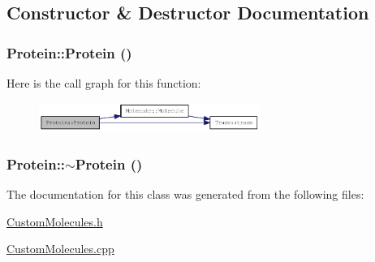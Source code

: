 \subsection{Constructor \& Destructor Documentation}
\hypertarget{classProtein_a4610c6369d2f7e4bd31481d53e5001a1}{
\subsubsection[{Protein}]{\setlength{\rightskip}{0pt plus 5cm}Protein::Protein ()}}
\label{classProtein_a4610c6369d2f7e4bd31481d53e5001a1}


Here is the call graph for this function:\nopagebreak
\begin{figure}[H]
\begin{center}
\leavevmode
\includegraphics[width=204pt]{classProtein_a4610c6369d2f7e4bd31481d53e5001a1_cgraph}
\end{center}
\end{figure}
\hypertarget{classProtein_a86b3ed374eead087b00d556915a584f6}{
\subsubsection[{$\sim$Protein}]{\setlength{\rightskip}{0pt plus 5cm}Protein::$\sim$Protein ()}}
\label{classProtein_a86b3ed374eead087b00d556915a584f6}


The documentation for this class was generated from the following files:\begin{DoxyCompactItemize}
\item 
\hyperlink{CustomMolecules_8h}{CustomMolecules.h}\item 
\hyperlink{CustomMolecules_8cpp}{CustomMolecules.cpp}\end{DoxyCompactItemize}
